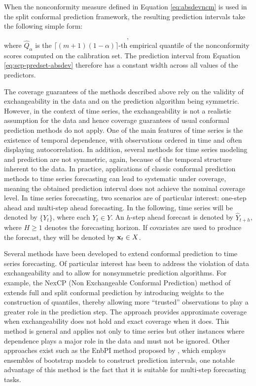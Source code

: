 When the nonconformity measure defined in Equation \eqref{eq:absdevncm}
is used in the split conformal prediction framework, the resulting
prediction intervals take the following simple form:

\begin{equation}
[\hat{Y}_{n+1}-\hat{Q}_\alpha, \hat{Y}_{n+1}+\hat{Q}_\alpha],
\label{eq:scp-predset-absdev}
\end{equation} where \(\hat{Q}_\alpha\) is the
\(\lceil (m+1)(1-\alpha) \rceil\)-th empirical quantile of the
nonconformity scores computed on the calibration set. The prediction
interval from Equation \eqref{eq:scp-predset-absdev} therefore has a
constant width across all values of the predictors.

The coverage guarantees of the methods described above rely on the
validity of exchangeability in the data and on the prediction algorithm
being symmetric. However, in the context of time series, the
exchangeability is not a realistic assumption for the data and hence
coverage guarantees of usual conformal prediction methods do not apply.
One of the main features of time series is the existence of temporal
dependence, with observations ordered in time and often displaying
autocorrelation. In addition, several methods for time series modeling
and prediction are not symmetric, again, because of the temporal
structure inherent to the data. In practice, applications of classic
conformal prediction methods to time series forecasting can lead to
systematic under coverage, meaning the obtained prediction interval does not
achieve the nominal coverage level. In time series forecasting, two
scenarios are of particular interest: one-step ahead and multi-step
ahead forecasting. In the following, time series will be denoted by
\(\{Y_t\}\), where each \(Y_t \in Y\). An \(h\)-step ahead forecast
is denoted by \(\hat Y_{t+h}\), where \(H\geq 1\) denotes the forecasting
horizon. If covariates are used to produce the forecast, they will be
denoted by \(\textbf x_t \in X\).

Several methods have been developed to extend conformal prediction to
time series forecasting. Of particular interest has been to address the
violation of data exchangeability and to allow for nonsymmetric
prediction algorithms. For example, the NexCP (Non Exchangeable
Conformal Prediction) method of \citet{barber2023} extends full and split
conformal prediction by introducing weights to the construction of
quantiles, thereby allowing more ``trusted'' observations to play a
greater role in the prediction step. The approach provides approximate
coverage when exchangeability does not hold and exact coverage when it
does. This method is general and applies not only to time series but
other instances where dependence plays a major role in the data and must
not be ignored. Other approaches exist such as the EnbPI method
proposed by \citet{xu2021}, which employs ensembles of bootstrap models to
construct prediction intervals, one notable advantage of this method is
the fact that it is suitable for multi-step forecasting tasks.

